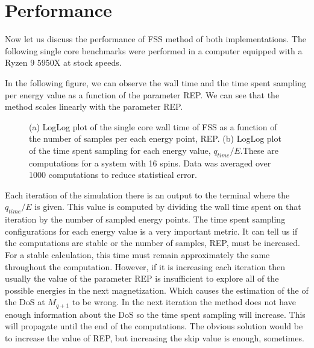 \section{Performance}

	Now let us discuss the performance of FSS method of both implementations. The following single core benchmarks were performed in a computer equipped with a Ryzen 9 5950X at stock speeds.  
	
	In the following figure, we can observe the wall time and the time spent sampling per energy value as a function of the parameter REP. We can see that the method scales linearly with the parameter REP. 
	
\begin{figure}[ht]
\centering
{}
\quad
\quad
\quad
{}	

\caption{(a) LogLog plot of the single core wall time of FSS as a function of the number of samples per each energy point, REP.  (b) LogLog plot of the time spent sampling for each energy value, $q_{time}/E$.These are computations for a system with 16 spins. Data was averaged over 1000 computations to reduce statistical error.}
\end{figure}

Each iteration of the simulation there is an output to the terminal where the $q_{time}/E$ is given. This value is computed by dividing the wall time spent on that iteration by the number of sampled energy points. 
The time spent sampling configurations for each energy value is a very important metric. It can tell us if the computations are stable or the number of samples, REP, must be increased. 
For a stable calculation, this time must remain approximately the same throughout the computation. However, if it is increasing each iteration then usually the value of the parameter REP is insufficient to explore all of the possible energies in the next magnetization. Which causes the estimation of the of the DoS at $M_{q+1}$ to be wrong. In the next iteration the method does not have enough information about the DoS so the time spent sampling will increase. This will propagate until the end of the computations. The obvious solution would be to increase the value of REP, but increasing the skip value is enough, sometimes.


